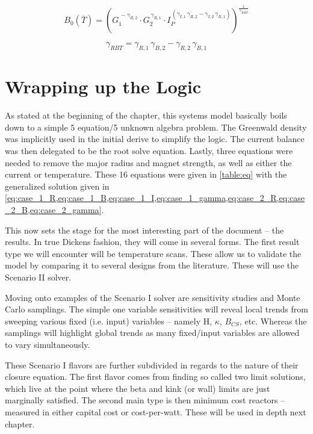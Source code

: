 \begin{equation}
	\label{eq:case_2_B}
	B_0( \overline T) = \left( 
	G_1 ^ {  \, -\gamma_{R,2} } \cdot 
	G_2 ^ {  \, \gamma_{R,1} } \cdot 
	I_P ^ {  \, ( \gamma_{I,1} \, \gamma_{R,2} - \gamma_{I,2} \, \gamma_{R,1} ) }\right)^{ \frac{1}{\gamma_{RBT}} }
\end{equation}

\begin{equation}
	\label{eq:case_2_gamma}
	\gamma_{RBT} = \gamma_{R,1} \, \gamma_{B,2} - \gamma_{R,2} \, \gamma_{B,1}
\end{equation}

\section{Wrapping up the Logic} 

As stated at the beginning of the chapter, this systems model basically boils down to a simple 5 equation/5 unknown algebra problem. The Greenwald density was implicitly used in the initial derive to simplify the logic. The current balance was then delegated to be the root solve equation. Lastly, three equations were needed to remove the major radius and magnet strength, as well as either the current or temperature. These 16 equations were given in \cref{table:eq} with the generalized solution given in \cref{eq:case_1_R,eq:case_1_B,eq:case_1_I,eq:case_1_gamma,eq:case_2_R,eq:case_2_B,eq:case_2_gamma}.

This now sets the stage for the most interesting part of the document -- the results. In true Dickens fashion, they will come in several forms. The first result type we will encounter will be temperature scans. These allow us to validate the model by comparing it to several designs from the literature. These will use the Scenario II solver.

Moving onto examples of the Scenario I solver are sensitivity studies and Monte Carlo samplings. The simple one variable sensitivities will reveal local trends from sweeping various fixed (i.e. input) variables -- namely H, $\kappa$, $B_{CS}$, etc. Whereas the samplings will highlight global trends as many fixed/input variables are allowed to vary simultaneously.

 These Scenario I flavors are further subdivided in regards to the nature of their closure equation. The first flavor comes from finding so called two limit solutions, which live at the point where the beta and kink (or wall) limits are just marginally satisfied. The second main type is then minimum cost reactors -- measured in either capital cost or cost-per-watt. These will be used in depth next chapter.
 
%
